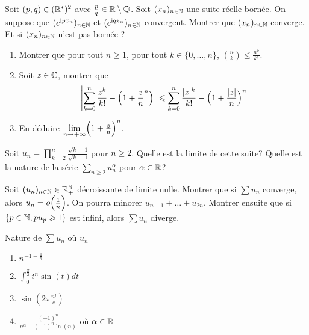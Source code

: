 \begin{exercise}
	Soit $(p,q)\in(\mathbb{R}^{*})^{2}$ avec $\frac{p}{q}\in\mathbb{R}\setminus\mathbb{Q}$. Soit
	$(x_{n})_{n\in\mathbb{N}}$ une suite réelle bornée. On suppose que
	$(e^{\mathrm{i}px_{n}})_{n\in\mathbb{N}}$ et $(e^{\mathrm{i}qx_{n}})_{n\in\mathbb{N}}$
	convergent. Montrer que $(x_{n})_{n\in\mathbb{N}}$ converge. Et si $(x_{n})_{n\in\mathbb{N}}$
	n'est pas bornée ?
\end{exercise}

\begin{exercise}
	\phantom{}
	\begin{enumerate}
		\item
		Montrer que pour tout $n\geqslant1$, pour tout $k\in\{0,\dots,n\}$,
		$\binom{n}{k}\leqslant\frac{n^{k}}{k!}$.
		\item
		Soit $z\in\mathbb{C}$, montrer que 
		$$\Biggl\vert\sum_{k=0}^{n}\frac{z^{k}}{k!}-\Bigl(1+\frac{z}{n}^{n}\Bigr)\Biggr\vert\leqslant\sum_{k=0}^{n}\frac{\vert
		z\vert^{k}}{k!}-\Bigl(1+\frac{\vert z\vert}{n}\Bigr)^{n}$$
		\item
		En déduire $\lim\limits_{n\to+\infty}\Bigl(1+\frac{z}{n}\Bigr)^{n}$.
	\end{enumerate}
\end{exercise}

\begin{exercise}
	Soit $u_{n}=\prod_{k=2}^{n}\frac{\sqrt{k}-1}{\sqrt{k}+1}$ pour $n\geqslant 2$.
	Quelle est la limite de cette suite? Quelle est la nature de la série
	$\sum_{n\geqslant 2}u_{n}^{\alpha}$ pour $\alpha\in\mathbb{R}$?
\end{exercise}

\begin{exercise}
	Soit $(u_{n})_{n\in\mathbb{N}}\in\mathbb{R}_{+}^{\mathbb{N}}$ décroissante de limite nulle. Montrer
	que si $\sum u_{n}$ converge, alors $u_{n}=o\Bigl(\frac{1}{n}\Bigr)$. On
	pourra minorer $u_{n+1}+\dots+u_{2n}$. Montrer ensuite que si $\{p\in\mathbb{N},
	pu_{p}\geqslant1\}$ est infini, alors $\sum u_{n}$ diverge.
\end{exercise}

\begin{exercise}
	Nature de $\sum u_{n}$ où $u_{n}=$
	\begin{enumerate}
		\item
		$n^{-1-\frac{1}{n}}$
		\item
		$\int_{0}^{\frac{\pi}{2}}t^{n}\sin(t)dt$
		\item
		$\sin(2\pi\frac{n!}{e})$
		\item
		$\frac{(-1)^{n}}{n^{\alpha}+(-1)^{n}\ln(n)}$ où $\alpha\in\mathbb{R}$
	\end{enumerate}
\end{exercise}

